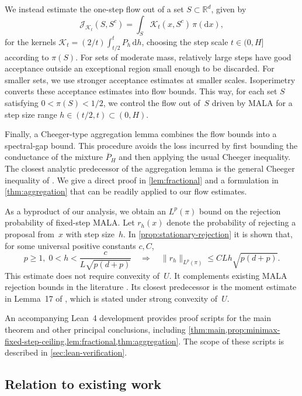\documentclass[11pt]{article}
\newcommand{\cK}{\mathcal K}
\newcommand{\1}{\mathbf 1}
\newcommand{\df}{\mathrm{d}}
\begin{document}
	We instead estimate the one-step flow out of a set $S \subset \mathbb{R}^d$, given by
	\[
	\mathcal J_{\cK_t}(S,S^c)=\int_S \cK_t(x,S^c)\,\pi(\df x),
	\]
	for the kernels $\cK_t=(2/t)\int_{t/2}^tP_h\,\df h$, choosing the step scale $t \in (0,H]$
	according to $\pi(S)$. For sets of moderate mass, relatively large steps
	have good acceptance outside an exceptional region small enough to be
	discarded. For smaller sets, we use stronger acceptance estimates at
	smaller scales.
	Isoperimetry converts these acceptance estimates into flow bounds.
	This way, for each set $S$ satisfying $0 < \pi(S) < 1/2$, we control the flow out of~$S$ driven by MALA for a step size range $h \in (t/2,t) \subset (0,H)$.
	
	Finally, a Cheeger-type aggregation lemma combines the flow bounds into a spectral-gap bound. This procedure avoids the loss incurred by first bounding the conductance of
	the mixture $\overline P_H$ and then applying the usual Cheeger inequality. The closest analytic predecessor of the aggregation lemma is the general
	Cheeger inequality of \citet{ChenWang2000}. We give a direct proof in
	\cref{lem:fractional} and a formulation in \cref{thm:aggregation} that can be readily applied to our flow estimates.
	
	As a byproduct of our analysis, we obtain an $L^p(\pi)$ bound on the rejection probability of fixed-step MALA.
	Let $r_h(x)$ denote the probability of rejecting a proposal from~$x$ with step size~$h$.
	In \cref{prop:stationary-rejection} it is shown that, for some universal positive constants $c, C$,
	\[
	p \geq 1, \; 0 < h < \frac{c}{L\sqrt{p(d+p)}} \quad \Longrightarrow \quad \|r_h\|_{L^p(\pi)} \leq C Lh \sqrt{p(d+p)}.
	\]
	This estimate does not require convexity of~$U$.
	It complements existing MALA rejection bounds in the literature \citep{ChewiEtAl2021,WuSchmidlerChen2022,ChenGatmiry2023}.
	Its closest predecessor is the moment estimate in Lemma~17 of \cite{ChewiEtAl2021}, which is stated under strong convexity of~$U$.
	
	
	An accompanying Lean~4 development \citep{qinMALALean2026} provides proof
	scripts for the main theorem and other principal conclusions, including
	\cref{thm:main,prop:minimax-fixed-step-ceiling,lem:fractional,thm:aggregation}.
	The scope of these scripts is described in \cref{sec:lean-verification}.
	
	\subsection*{Relation to existing work}
	
\end{document}
